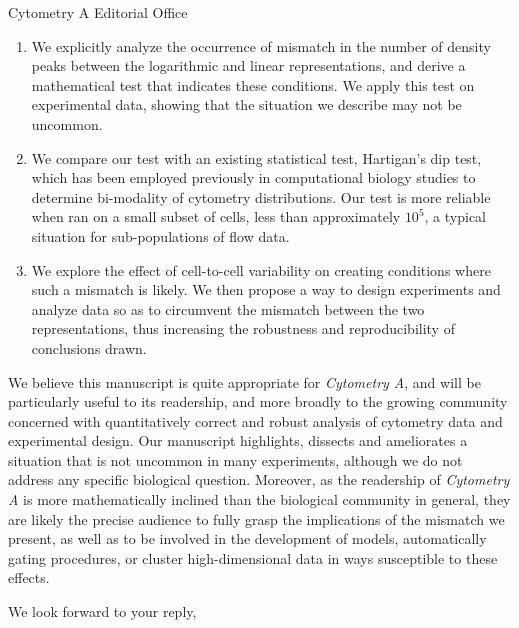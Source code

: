 \documentclass[11pt]{letter}
\begin{document}
\begin{letter}{Cytometry A Editorial Office}
\begin{enumerate}
\item We explicitly analyze the occurrence of mismatch in the number of density peaks between the logarithmic and linear representations, and derive a mathematical test that indicates these conditions. We apply this test on experimental data, showing that the situation we describe may not be uncommon.
\item We compare our test with an existing statistical test, Hartigan's dip test, which has been employed previously in computational biology studies to determine bi-modality of cytometry distributions. Our test is more reliable when ran on a small subset of cells, less than approximately $10^5$, a typical situation for sub-populations of flow data.
\item We explore the effect of cell-to-cell variability on creating conditions where such a mismatch is likely. We then propose a way to design experiments and analyze data so as to circumvent the mismatch between the two representations, thus increasing the robustness and reproducibility of conclusions drawn.
\end{enumerate}


We believe this manuscript is quite appropriate for {\it Cytometry A}, and will be particularly useful to its readership, and more broadly to the growing community concerned with quantitatively correct and robust analysis of cytometry data and experimental design. Our manuscript highlights, dissects and ameliorates a situation that is not uncommon in many experiments, although we do not address any specific biological question. Moreover, as the readership of {\it Cytometry A} is more mathematically inclined than the biological community in general, they are likely the precise audience to fully grasp the implications of the mismatch we present, as well as to be involved in the development of models, automatically gating procedures, or cluster high-dimensional data in ways susceptible to these effects. 



\closing{We look forward to your reply,}

\end{letter}
\end{document}
